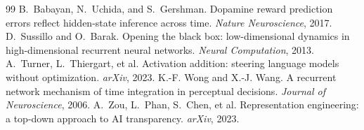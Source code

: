 \documentclass[11pt]{article}
\begin{document}
\begin{thebibliography}{99}
B.~Babayan, N.~Uchida, and S.~Gershman. Dopamine reward prediction errors reflect
hidden-state inference across time. \emph{Nature Neuroscience}, 2017.
 D.~Sussillo and O.~Barak.
Opening the black box: low-dimensional dynamics in high-dimensional recurrent neural
networks. \emph{Neural Computation}, 2013.
 A.~Turner, L.~Thiergart, et al.
Activation addition: steering language models without optimization. \emph{arXiv},
2023.
 K.-F. Wong and X.-J. Wang. A
recurrent network mechanism of time integration in perceptual decisions.
\emph{Journal of Neuroscience}, 2006.
 A.~Zou, L.~Phan, S.~Chen, et al.
Representation engineering: a top-down approach to AI transparency. \emph{arXiv},
2023.
\end{thebibliography}
\end{document}
